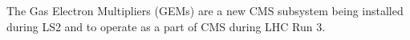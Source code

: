 The Gas Electron Multipliers (GEMs) are a new CMS subsystem being installed during LS2 and to operate as a part of CMS during LHC Run 3. 

